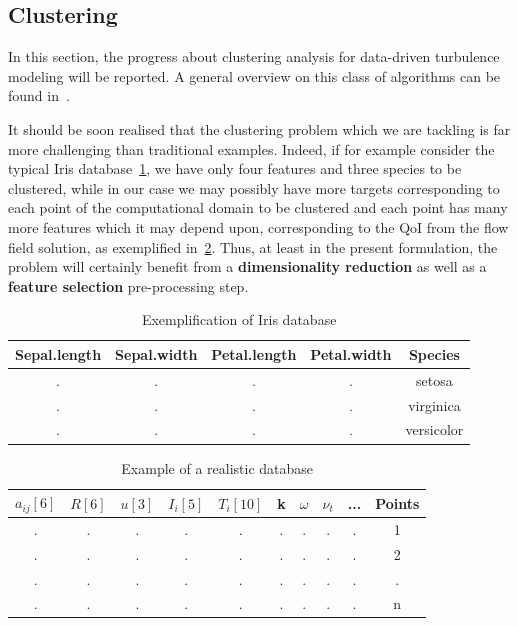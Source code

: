 \subsection{Clustering}
In this section, the progress about clustering analysis for data-driven turbulence modeling will be reported. A general overview on this class of algorithms can be found in~\cite{bouveyron2019model,giordani2020introduction,skiadas2019data}.

It should be soon realised that the clustering problem which we are tackling is far more challenging than traditional examples. Indeed, if for example consider the typical Iris database~\ref{tab:iris}, we have only four features and three species to be clustered, while in our case we may possibly have more targets corresponding to each point of the computational domain to be clustered and each point has many more features which it may depend upon, corresponding to the QoI from the flow field solution, as exemplified in~\ref{tab:reality}. Thus, at least in the present formulation, the problem will certainly benefit from a \textbf{dimensionality reduction} as well as a \textbf{feature selection} pre-processing step.
%
\begin{table}[H]
\begin{centering}
\begin{tabular}{ccccc}
Sepal.length & Sepal.width & Petal.length & Petal.width & Species\tabularnewline
\hline
\hline
. & . & . & . & setosa\tabularnewline
\hline
. & . & . & . & virginica\tabularnewline
\hline
. & . & . & . & versicolor\tabularnewline
\hline
\end{tabular}
\par\end{centering}
\caption{\label{tab:iris}Exemplification of Iris database}
\end{table}
%
\begin{table}[H]
\begin{centering}
\begin{tabular}{cccccccccc}
$a_{ij}\left[6\right]$ & $R\left[6\right]$ & \textbf{$u\left[3\right]$} & $I_{i}\left[5\right]$ & $T_{i}\left[10\right]$ & k & $\omega$ & $\nu_{t}$ & ... & Points\tabularnewline
\hline
\hline
. & . & . & . & . & . & . & . & . & 1\tabularnewline
\hline
. & . & . & . & . & . & . & . & . & 2\tabularnewline
\hline
. & . & . & . & . & . & . & . & . & .\tabularnewline
\hline
. & . & . & . & . & . & . & . & . & n\tabularnewline
\hline
\end{tabular}
\par\end{centering}
\caption{\label{tab:reality}Example of a realistic database}
\end{table}

